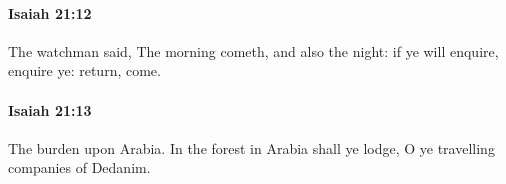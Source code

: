 		\paragraph{Isaiah 21:12} %
			\label{ISAIAH-21-12}

			The watchman said, The morning cometh, and also the night: if ye will enquire, enquire ye: return, come.


		\paragraph{Isaiah 21:13} %
			\label{ISAIAH-21-13}

			The burden upon Arabia. In the forest in Arabia shall ye lodge, O ye travelling companies of Dedanim.


